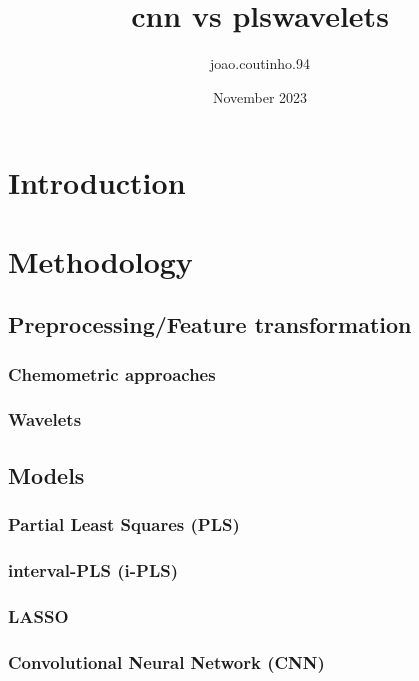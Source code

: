 \documentclass{article}
\title{cnn vs plswavelets}
\author{joao.coutinho.94 }
\date{November 2023}
\begin{document}
	
	\maketitle
	
	\section{Introduction}
	
	\section{Methodology}
	
	\subsection{Preprocessing/Feature transformation}
	
	\subsubsection{Chemometric approaches}
	
	\subsubsection{Wavelets}
	
	\subsection{Models}
	
	\subsubsection{Partial Least Squares (PLS)}
	
	\subsubsection{interval-PLS (i-PLS)}
	
	\subsubsection{LASSO}
	
	\subsubsection{Convolutional Neural Network (CNN)}
	
\end{document}
